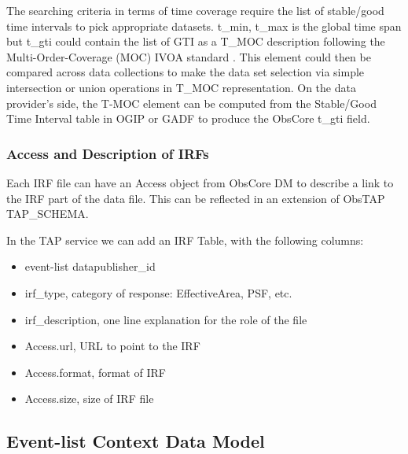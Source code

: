 \documentclass[11pt,a4paper]{ivoa}
\begin{document}
The searching criteria in terms of time coverage require the list of stable/good time intervals to pick appropriate datasets.
t\_min, t\_max is the global time span but t\_gti could contain the list of GTI as a T\_MOC description following the Multi-Order-Coverage (MOC) IVOA standard \citep{2022ivoa.spec.0727F}.
This element could then be compared across data collections to make the data set selection via simple intersection or union operations in T\_MOC representation.
On the data provider's side, the T-MOC element can be computed from the Stable/Good Time Interval table in OGIP or GADF to produce the ObsCore t\_gti field.




\subsubsection{Access and Description of IRFs}

Each IRF file can have an Access object from ObsCore DM to describe a link to the IRF part of the data file.
This can be reflected in an extension of ObsTAP TAP\_SCHEMA.

In the TAP service we can add an IRF Table, with the following columns:

\begin{itemize}
    \item event-list datapublisher\_id
    \item irf\_type, category of response: EffectiveArea, PSF, etc.
    \item irf\_description, one line explanation for the role of the file
    \item Access.url, URL to point to the IRF
    \item Access.format, format of IRF
    \item Access.size, size of IRF file
\end{itemize}



\subsection{Event-list Context Data Model}
\label{sec:EventListContext}
\end{document}

